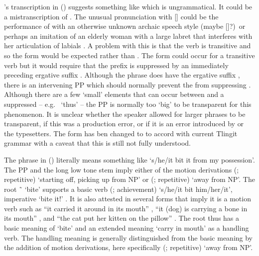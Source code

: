 \citeauthor{swanton:1909}’s transcription  in (\lastx) suggests something like  which is ungrammatical.
It could be a mistranscription of . 
The unusual pronunciation with [] could be the performance of  with an otherwise unknown archaic speech style (maybe []?)\ or perhaps an imitation of an elderly woman with a large labret that interferes with her articulation of labials \parencites[cf.][444]{de-laguna:1972}[319]{mcclellan:1975a}[245–248]{emmons:1991}[64–65]{kan:2016}.
A problem with this is that the verb is transitive and so the form  would be expected rather than .
The  form could occur for a transitive verb but it would require that the  prefix is suppressed by an immediately preceding ergative suffix  \parencites[25]{leer:1991}{crippen:2016}[724]{crippen:2019}.
Although the phrase  does have the ergative suffix , there is an intervening PP  which should normally prevent the  from suppressing .
Although there are a few ‘small’ elements that can occur between  and a suppressed  – e.g.\  ‘thus’ – the PP  is normally too ‘big’ to be transparent for this phenomenon.
It is unclear whether the speaker allowed for larger phrases to be transparent, if this was a production error, or if it is an error introduced by \citeauthor{swanton:1909} or the typesetters.
The form has ben changed to  to accord with current Tlingit grammar with a caveat that this is still not fully understood.

The phrase  in (\lastx) literally means something like ‘s/he/it bit it from my possession’.
The PP  and the long low tone  stem  imply either of the motion derivations  (;  repetitive) ‘starting off, picking up from NP’ or  (;  repetitive) ‘away from NP’.
The root  \~\  ‘bite’ supports a basic verb  (; achievement) ‘s/he/it bit him/her/it’, imperative  ‘bite it!’ \parencites[03/236]{leer:1973}[217]{leer:1976}.
It is also attested in several forms that imply it is a motion verb such as
 “it carried it around in its mouth” \parencites[03/236]{leer:1973},
 “it (dog) is carrying a bone in its mouth” \parencite[43.443]{story-naish:1973},
and  “the cat put her kitten on the pillow” \parencite[163.2234]{story-naish:1973}.
The root thus has a basic meaning of ‘bite’ and an extended meaning ‘carry in mouth’ as a handling verb.
The handling meaning is generally distinguished from the basic meaning by the addition of motion derivations, here specifically  (;  repetitive) ‘away from NP’.


